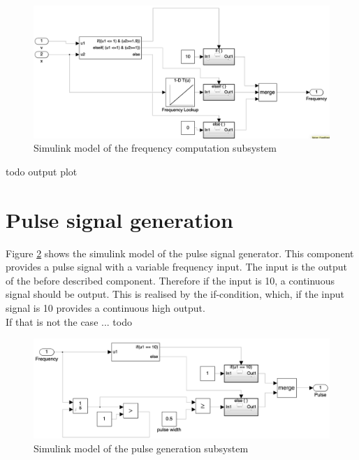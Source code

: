 \begin{figure}[H]
\centering
\includegraphics[width=1\textwidth]{images/D6_Frequency_Computation.png}
\caption{Simulink model of the frequency computation subsystem}
\label{fig:D6_Frequency_Computation}
\end{figure}

todo output plot
\section{Pulse signal generation}\label{sec:D6Signal}
Figure \ref{fig:D6_Pulse_Signal} shows the simulink model of the pulse signal generator.
This component provides a pulse signal with a variable frequency input.
The input is the output of the before described component.
Therefore if the input is 10, a continuous signal should be output.
This is realised by the if-condition, which, if the input signal is 10 provides a continuous high output.\\
If that is not the case ... todo
\begin{figure}[H]
\centering
\includegraphics[width=1\textwidth]{images/D6_provide_signal.png}
\caption{Simulink model of the pulse generation subsystem}
\label{fig:D6_Pulse_Signal}
\end{figure}

